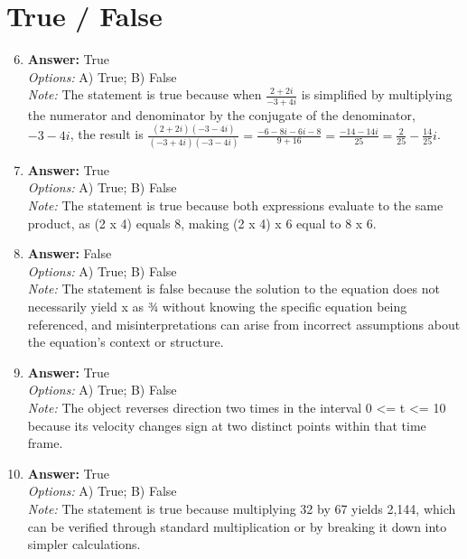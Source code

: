 \documentclass[12pt]{article}
\begin{document}
\section*{True / False}
\begin{enumerate}[label=\arabic*.]
\setcounter{enumi}{5}
\item \textbf{Answer:} True
\\ \textit{Options:} A) True; B) False
\\ \textit{Note:} The statement is true because when \( \frac{2+2 i}{-3+4 i} \) is simplified by multiplying the numerator and denominator by the conjugate of the denominator, \(-3-4 i\), the result is \( \frac{(2+2 i)(-3-4 i)}{(-3+4 i)(-3-4 i)} = \frac{-6 - 8 i - 6 i - 8}{9 + 16} = \frac{-14 - 14 i}{25} = \frac{2}{25} - \frac{14}{25}i\).
\item \textbf{Answer:} True
\\ \textit{Options:} A) True; B) False
\\ \textit{Note:} The statement is true because both expressions evaluate to the same product, as (2 x 4) equals 8, making (2 x 4) x 6 equal to 8 x 6.
\item \textbf{Answer:} False
\\ \textit{Options:} A) True; B) False
\\ \textit{Note:} The statement is false because the solution to the equation does not necessarily yield x as ¾ without knowing the specific equation being referenced, and misinterpretations can arise from incorrect assumptions about the equation's context or structure.
\item \textbf{Answer:} True
\\ \textit{Options:} A) True; B) False
\\ \textit{Note:} The object reverses direction two times in the interval 0 \textless{}= t \textless{}= 10 because its velocity changes sign at two distinct points within that time frame.
\item \textbf{Answer:} True
\\ \textit{Options:} A) True; B) False
\\ \textit{Note:} The statement is true because multiplying 32 by 67 yields 2,144, which can be verified through standard multiplication or by breaking it down into simpler calculations.
\end{enumerate}
\end{document}

